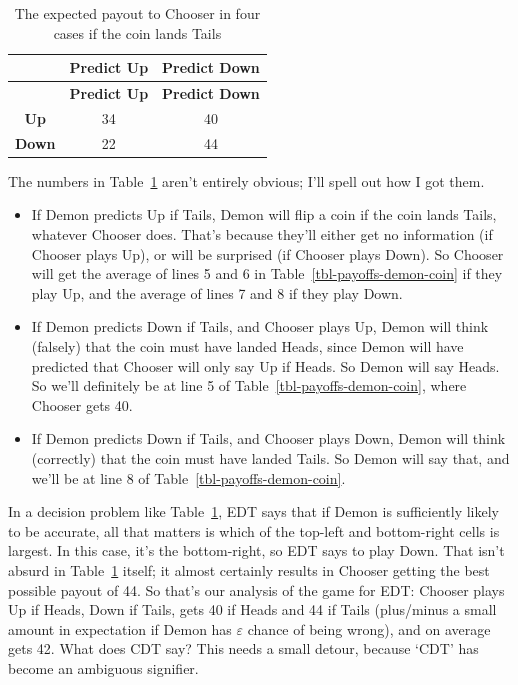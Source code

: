 \documentclass[
  11pt,
  letterpaper,
  DIV=11,
  numbers=noendperiod,
  twoside]{scrartcl}
\providecommand{\tightlist}{%
  \setlength{\itemsep}{0pt}\setlength{\parskip}{0pt}}
\begin{document}
\begin{longtable}[]{@{}ccc@{}}
\caption{The expected payout to Chooser in four cases if the coin lands
Tails}\label{tbl-payout-if-tails}\tabularnewline
\toprule\noalign{}
& \textbf{Predict Up} & \textbf{Predict Down} \\
\midrule\noalign{}
\endfirsthead
\toprule\noalign{}
& \textbf{Predict Up} & \textbf{Predict Down} \\
\midrule\noalign{}
\endhead
\bottomrule\noalign{}
\endlastfoot
\textbf{Up} & 34 & 40 \\
\textbf{Down} & 22 & 44 \\
\end{longtable}

The numbers in Table~\ref{tbl-payout-if-tails} aren't entirely obvious;
I'll spell out how I got them.

\begin{itemize}
\tightlist
\item
  If Demon predicts Up if Tails, Demon will flip a coin if the coin
  lands Tails, whatever Chooser does. That's because they'll either get
  no information (if Chooser plays Up), or will be surprised (if Chooser
  plays Down). So Chooser will get the average of lines 5 and 6 in
  Table~\ref{tbl-payoffs-demon-coin} if they play Up, and the average of
  lines 7 and 8 if they play Down.
\item
  If Demon predicts Down if Tails, and Chooser plays Up, Demon will
  think (falsely) that the coin must have landed Heads, since Demon will
  have predicted that Chooser will only say Up if Heads. So Demon will
  say Heads. So we'll definitely be at line 5 of
  Table~\ref{tbl-payoffs-demon-coin}, where Chooser gets 40.
\item
  If Demon predicts Down if Tails, and Chooser plays Down, Demon will
  think (correctly) that the coin must have landed Tails. So Demon will
  say that, and we'll be at line 8 of
  Table~\ref{tbl-payoffs-demon-coin}.
\end{itemize}

In a decision problem like Table~\ref{tbl-payout-if-tails}, EDT says
that if Demon is sufficiently likely to be accurate, all that matters is
which of the top-left and bottom-right cells is largest. In this case,
it's the bottom-right, so EDT says to play Down. That isn't absurd in
Table~\ref{tbl-payout-if-tails} itself; it almost certainly results in
Chooser getting the best possible payout of 44. So that's our analysis
of the game for EDT: Chooser plays Up if Heads, Down if Tails, gets 40
if Heads and 44 if Tails (plus/minus a small amount in expectation if
Demon has \(\varepsilon\) chance of being wrong), and on average gets
42. What does CDT say? This needs a small detour, because `CDT' has
become an ambiguous signifier.
\end{document}
